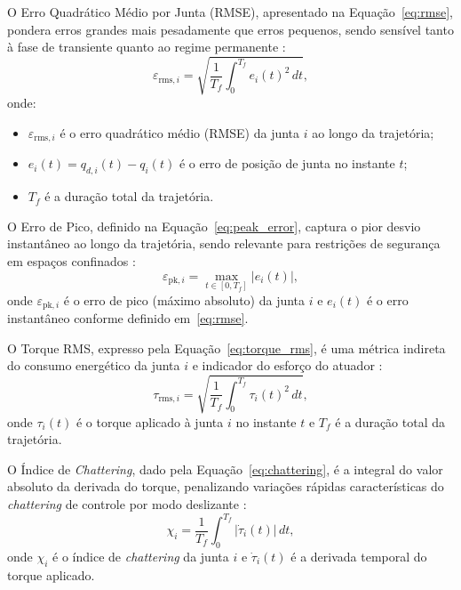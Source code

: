 O Erro Quadrático Médio por Junta (RMSE), apresentado na Equação~\eqref{eq:rmse}, pondera erros grandes mais pesadamente que erros pequenos, sendo sensível tanto à fase de transiente quanto ao regime permanente \cite{astrom1995theory}:
\begin{equation}
    \varepsilon_{\text{rms},i} = \sqrt{\frac{1}{T_f}\int_0^{T_f} e_i(t)^2\,dt},
    \label{eq:rmse}
\end{equation}
onde:
\begin{itemize}
    \item $\varepsilon_{\text{rms},i}$ é o erro quadrático médio (RMSE) da junta $i$ ao longo da trajetória;
    \item $e_i(t) = q_{d,i}(t) - q_i(t)$ é o erro de posição de junta no instante $t$;
    \item $T_f$ é a duração total da trajetória.
\end{itemize}

O Erro de Pico, definido na Equação~\eqref{eq:peak_error}, captura o pior desvio instantâneo ao longo da trajetória, sendo relevante para restrições de segurança em espaços confinados \cite{siciliano2009robotics}:
\begin{equation}
    \varepsilon_{\text{pk},i} = \max_{t \in [0, T_f]} |e_i(t)|,
    \label{eq:peak_error}
\end{equation}
onde $\varepsilon_{\text{pk},i}$ é o erro de pico (máximo absoluto) da junta $i$ e $e_i(t)$ é o erro instantâneo conforme definido em~\eqref{eq:rmse}.

O Torque RMS, expresso pela Equação~\eqref{eq:torque_rms}, é uma métrica indireta do consumo energético da junta $i$ e indicador do esforço do atuador \cite{spong2020robot, craig1989introduction}:
\begin{equation}
    \tau_{\text{rms},i} = \sqrt{\frac{1}{T_f}\int_0^{T_f} \tau_i(t)^2\,dt},
    \label{eq:torque_rms}
\end{equation}
onde $\tau_i(t)$ é o torque aplicado à junta $i$ no instante $t$ e $T_f$ é a duração total da trajetória.

O Índice de \textit{Chattering}, dado pela Equação~\eqref{eq:chattering}, é a integral do valor absoluto da derivada do torque, penalizando variações rápidas características do \textit{chattering} de controle por modo deslizante \cite{edwards1998sliding, utkin2017sliding}:
\begin{equation}
    \chi_i = \frac{1}{T_f}\int_0^{T_f} |\dot{\tau}_i(t)|\,dt,
    \label{eq:chattering}
\end{equation}
onde $\chi_i$ é o índice de \textit{chattering} da junta $i$ e $\dot{\tau}_i(t)$ é a derivada temporal do torque aplicado.

